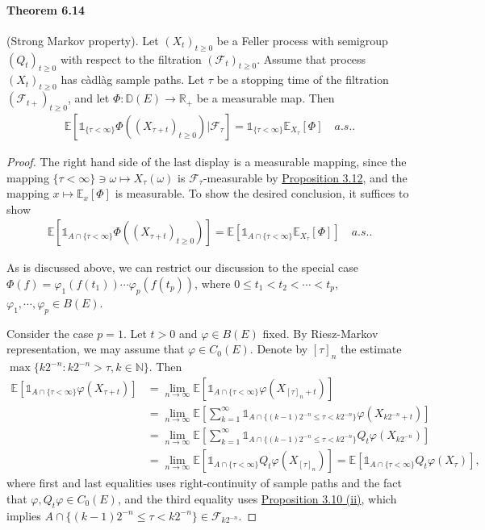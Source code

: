 \documentclass{article}
\numberwithin{equation}{section}
\newcommand{\E}{\mathbb{E}}
\theoremstyle{plain}
\theoremstyle{definition}
\begin{document}
\paragraph{Theorem 6.14\label{thm:6.14}} (Strong Markov property). Let $(X_t)_{t\geq 0}$ be a Feller process with semigroup $(Q_t)_{t\geq 0}$ with respect to the filtration $(\mathscr{F}_t)_{t\geq 0}$. Assume that process $(X_t)_{t\geq 0}$ has càdlàg sample paths. Let $\tau$ be a stopping time of the filtration $(\mathscr{F}_{t+})_{t\geq 0}$, and let $\Phi:\mathbb{D}(E)\to\mathbb{R}_+$ be a measurable map. Then
\begin{align*}
	\E\left[\mathds{1}_{\{\tau<\infty\}}\Phi((X_{\tau+t})_{t\geq 0})|\mathscr{F}_\tau\right]=\mathds{1}_{\{\tau<\infty\}}\E_{X_\tau}[\Phi]\quad a.s..
\end{align*}
\begin{proof}
The right hand side of the last display is a measurable mapping, since the mapping  $\{\tau<\infty\}\ni\omega\mapsto X_\tau(\omega)$ is $\mathscr{F}_\tau$-measurable by \hyperref[prop:3.12]{Proposition 3.12}, and the mapping $x\mapsto\E_x[\Phi]$ is measurable. To show the desired conclusion, it suffices to show
\begin{align*}
	\E\left[\mathds{1}_{A\cap\{\tau<\infty\}}\Phi((X_{\tau+t})_{t\geq 0})\right]=\E\left[\mathds{1}_{A\cap\{\tau<\infty\}}\E_{X_\tau}[\Phi]\right]\quad a.s..
\end{align*}

As is discussed above, we can restrict our discussion to the special case $\Phi(f)=\varphi_1(f(t_1))\cdots\varphi_p(f(t_p))$, where $0\leq t_1<t_2<\cdots<t_p$, $\varphi_1,\cdots,\varphi_p\in B(E)$. 

Consider the case $p=1$. Let $t>0$ and $\varphi\in B(E)$ fixed. By Riesz-Markov representation, we may assume that $\varphi\in C_0(E)$. Denote by $[\tau]_n$ the estimate $\max\{k2^{-n}:k2^{-n}>\tau, k\in\mathbb{N}\}$.  Then
\begin{align*}
	\E\left[\mathds{1}_{A\cap\{\tau<\infty\}}\varphi(X_{\tau+t})\right]&=\lim_{n\to\infty}\E\left[\mathds{1}_{A\cap\{\tau<\infty\}}\varphi(X_{[\tau]_n+t})\right]\\
	&=\lim_{n\to\infty}\E\left[\sum_{k=1}^\infty\mathds{1}_{A\cap\{(k-1)2^{-n}\leq\tau<k2^{-n}\}}\varphi(X_{k2^{-n}+t})\right]\\
	&=\lim_{n\to\infty}\E\left[\sum_{k=1}^\infty\mathds{1}_{A\cap\{(k-1)2^{-n}\leq\tau<k2^{-n}\}}Q_t\varphi(X_{k2^{-n}})\right]\\
	&=\lim_{n\to\infty}\E\left[\mathds{1}_{A\cap\{\tau<\infty\}}Q_t\varphi(X_{[\tau]_n})\right]=\E\left[\mathds{1}_{A\cap\{\tau<\infty\}}Q_t\varphi(X_{\tau})\right],
\end{align*}
where first and last equalities uses right-continuity of sample paths and the fact that $\varphi,Q_t\varphi\in C_0(E)$, and the third equality uses \hyperref[prop:3.10]{Proposition 3.10 (ii)}, which implies $A\cap\{(k-1)2^{-n}\leq\tau<k2^{-n}\}\in\mathscr{F}_{k2^{-n}}$.


\end{proof}
\end{document}
